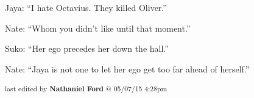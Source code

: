 
Jaya: ``I hate Octavius.  They killed Oliver.''

Nate: ``Whom you didn't like until that moment.''



Suko: ``Her ego precedes her down the hall.''

Nate: ``Jaya is not one to let her ego get too far ahead of herself.''


\iffalse

======================
THESE ARE ERRORS ENCOUNTERED DURING THE EXPORT PROCESS
======================

	Unable to highlight for footnote: Note that this is the TA Agent HQ, not the TA HQ, which is a bit more decentralized or more accurately places as the Security Triumvirate. because:GivenExpectedTA Agent HQTA HQ

	Unable to find a matching comment for footnote: _Marked as resolved_

	Unable to find a matching comment for footnote: _Re-opened_


\fi

\vspace{\fill}

\begin{flushright}
\textsubscript{last edited by \textbf{Nathaniel Ford} @ 05/07/15 4:28pm}
\end{flushright}

